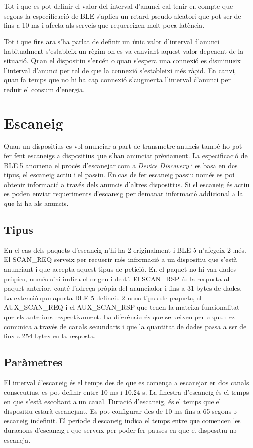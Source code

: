 Tot i que es pot definir el valor del interval d'anunci cal tenir en compte que segons la especificació de BLE s'aplica un retard pseudo-aleatori que pot ser de fins a 10 ms i afecta als serveis que requereixen molt poca latència.

Tot i que fins ara s'ha parlat de definir un únic valor d'interval d'anunci habitualment s'estableix un règim on es va canviant aquest valor depenent de la situació.
Quan el dispositiu s'encén o quan s'espera una connexió es disminueix l'interval d'anunci per tal de que la connexió s'estableixi més ràpid.
En canvi, quan fa temps que no hi ha cap connexió s'augmenta l'interval d'anunci per reduir el consum d'energia. 


\section{Escaneig}
Quan un dispositius es vol anunciar a part de transmetre anuncis també ho pot fer fent escaneigs a dispositius que s'han anunciat prèviament.
La especificació de BLE 5 anomena el procés d'escanejar com a \textit{Device Discovery} i es basa en dos tipus, el escaneig actiu i el passiu.
En cas de fer escaneig passiu només es pot obtenir informació a través dels anuncis d'altres dispositius.
Si el escaneig és actiu es poden enviar requeriments d'escaneig per demanar informació addicional a la que hi ha als anuncis.

\subsection{Tipus}
En el cas dels paquets d'escaneig n'hi ha 2 originalment i BLE 5 n'afegeix 2 més.
El SCAN\_REQ serveix per requerir més informació a un dispositiu que s'està anunciant i que accepta aquest tipus de petició.
En el paquet no hi van dades pròpies, només s'hi indica el origen i destí.
El SCAN\_RSP és la resposta al paquet anterior, conté l'adreça pròpia del anunciador i fins a 31 bytes de dades.
La extensió que aporta BLE 5 defineix 2 nous tipus de paquets, el AUX\_SCAN\_REQ i el AUX\_SCAN\_RSP que tenen la mateixa funcionalitat que els anteriors respectivament.
La diferència és que serveixen per a quan es comunica a través de canals secundaris i que la quantitat de dades passa a ser de fins a 254 bytes en la resposta.

\subsection{Paràmetres}
El interval d'escaneig és el temps des de que es comença a escanejar en dos canals consecutius, es pot definir entre 10 ms i 10.24 s.
La finestra d'escaneig és el temps en que s'està escoltant a un canal.
Duració d'escaneig, és el temps que el dispositiu estarà escanejant.
Es pot configurar des de 10 ms fins a 65 segons o escaneig indefinit.
El període d'escaneig indica el temps entre que comencen les duracions d'escaneig i que serveix per poder fer pauses en que el dispositiu no escaneja. 

